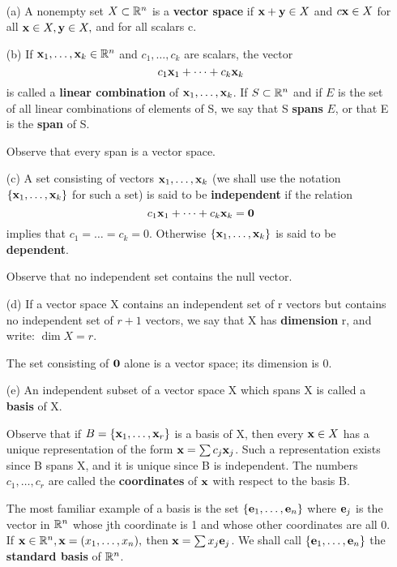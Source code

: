\begin{definition}
  \label{def:chap9:vector_space_definitions}
  ~ %
  \begin{enumerate}
    \item[(a)] A nonempty set $X \subset \mathbb{R}^n$ is a \textbf{vector
      space} if $\mathbf{x} + \mathbf{y} \in X$ and $c\mathbf{x} \in X$ for
      all $\mathbf{x} \in X, \mathbf{y} \in X,$ and for all scalars c.

    \item[(b)] If $\mathbf{x}_1, \dots, \mathbf{x}_k \in \mathbb{R}^n$ and $c_1,
      \dots, c_k$ are scalars, the vector
      \[
        c_1 \mathbf{x}_1 + \dots + c_k \mathbf{x}_k
      \]
      is called a \textbf{linear combination} of $\mathbf{x}_1, \dots,
      \mathbf{x}_k$. If $S \subset \mathbb{R}^n$ and if $E$ is the set of all
      linear combinations of elements of S, we say that S
      \textbf{spans} $E$, or that E is the \textbf{span} of S.

      Observe that every span is a vector space.

    \item[(c)] A set consisting of vectors $\mathbf{x}_1, \dots,
      \mathbf{x}_k$ (we shall use the notation $\{ \mathbf{x}_1, \dots,
      \mathbf{x}_k \}$ for such a set) is said to be
      \textbf{independent} if the relation
      \[
        c_1 \mathbf{x}_1 + \dots + c_k \mathbf{x}_k = \mathbf{0}
      \]
      implies that $c_1 = \dots = c_k = 0$. Otherwise $\{ \mathbf{x}_1,
      \dots, \mathbf{x}_k \}$ is said to be \textbf{dependent}.

      Observe that no independent set contains the null vector.

    \item[(d)] If a vector space X contains an independent set of r
      vectors but contains no independent set of $r+1$ vectors, we
      say that X has \textbf{dimension} r, and write: $\dim X = r$.

      The set consisting of $\mathbf{0}$ alone is a vector space; its
      dimension is 0.

    \item[(e)] An independent subset of a vector space X which spans
      X is called a \textbf{basis} of X.

      Observe that if $B = \{ \mathbf{x}_1, \dots, \mathbf{x}_r \}$ is a
      basis of X, then every $\mathbf{x} \in X$ has a unique
      representation of the form $\mathbf{x} = \sum c_j \mathbf{x}_j$.
      Such a representation exists since B spans X, and it is unique
      since B is independent. The numbers $c_1, \dots, c_r$ are
      called the \textbf{coordinates} of $\mathbf{x}$ with respect to the basis B.

      The most familiar example of a basis is the set $\{ \mathbf{e}_1,
      \dots, \mathbf{e}_n \}$ where $\mathbf{e}_j$ is the vector in
      $\mathbb{R}^n$ whose jth coordinate is 1 and whose other coordinates
      are all 0. If $\mathbf{x} \in \mathbb{R}^n, \mathbf{x} = (x_1, \dots,
      x_n),$ then $\mathbf{x} = \sum x_j \mathbf{e}_j$. We shall call $\{
      \mathbf{e}_1, \dots, \mathbf{e}_n \}$ the \textbf{standard basis} of $\mathbb{R}^n$.
  \end{enumerate}
\end{definition}


